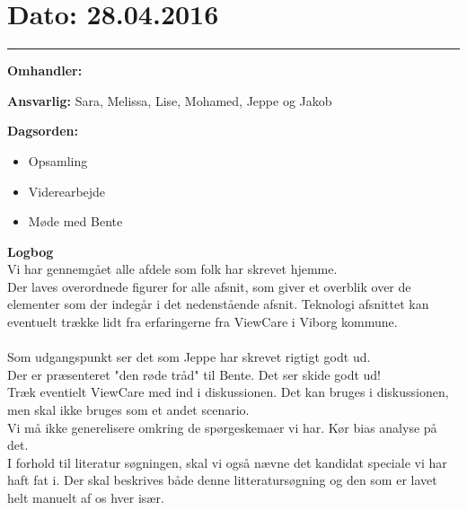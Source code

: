 \section{Dato: 28.04.2016}
\hrule

\textbf{Omhandler:}

\textbf{Ansvarlig:} Sara, Melissa, Lise, Mohamed, Jeppe og Jakob

\textbf{Dagsorden:}
\begin{itemize}
	\item Opsamling
	\item Viderearbejde
	\item Møde med Bente
\end{itemize}

\textbf{Logbog}
\\
Vi har gennemgået alle afdele som folk har skrevet hjemme.\\
Der laves overordnede figurer for alle afsnit, som giver et overblik over de elementer som der indegår i det nedenstående afsnit. Teknologi afsnittet kan eventuelt trække lidt fra erfaringerne fra ViewCare i Viborg kommune.\\
\\
Som udgangspunkt ser det som Jeppe har skrevet rigtigt godt ud.\\
Der er præsenteret "den røde tråd" til Bente. Det ser skide godt ud!\\
Træk eventielt ViewCare med ind i diskussionen. Det kan bruges i diskussionen, men skal ikke bruges som et andet scenario.\\ 
Vi må ikke generelisere omkring de spørgeskemaer vi har. Kør bias analyse på det.\\
I forhold til literatur søgningen, skal vi også nævne det kandidat speciale vi har haft fat i. Der skal beskrives både denne litteratursøgning og den som er lavet helt manuelt af os hver især.\\
